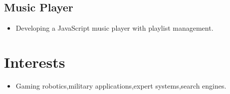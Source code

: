 \documentclass{article}
\begin{document}
\subsection*{Music Player}
\begin{itemize}[leftmargin=0.5cm]
    \item Developing a JavaScript music player with playlist management.
\end{itemize}


\section*{Interests}
\begin{itemize}[leftmargin=0.5cm]
    \item Gaming robotics,military applications,expert systems,search engines.
\end{itemize}
\end{document}
